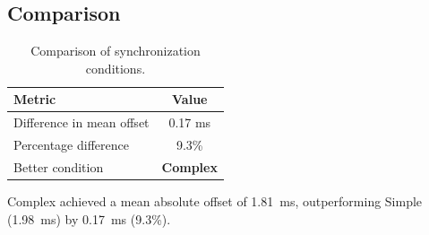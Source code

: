 \subsection*{Comparison}

\begin{table}[h!]
\centering
\begin{tabular}{|l|c|}
\hline
Metric & Value \\
\hline
Difference in mean offset & 0.17 ms \\
Percentage difference & 9.3\% \\
Better condition & \textbf{Complex} \\
\hline
\end{tabular}
\caption{Comparison of synchronization conditions.}
\label{tab:sync_comparison}
\end{table}

Complex achieved a mean absolute offset of 1.81~ms, outperforming Simple (1.98~ms) by 0.17~ms (9.3\%).
